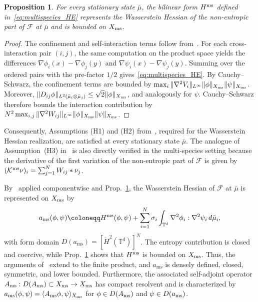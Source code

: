 \documentclass[letterpaper, 10pt, conference]{ieeeconf}
\newtheorem{proposition}[theorem]{Proposition}
\newcommand{\T}{\mathbb{T}}
\newcommand{\F}{\mathcal{F}}
\newcommand{\dotHk}[1][k]{\dot{H}^{#1}}
\begin{document}
\begin{proposition}
    \label{prop:multispecies_hessian_bound}
    For every stationary state $\bar\mu$, the bilinear form $H^{\rm ms}$ defined in~\eqref{eq:multispecies_HE} represents the Wasserstein Hessian of the non-entropic part of $\F$ at $\bar\mu$ and is bounded on $X_{\rm ms}$.
\end{proposition}

\begin{proof}
    The confinement and self-interaction terms follow from~\cite[Ex.~2.4]{KaliseMoschenPavliotis2026}.
    For each cross-interaction pair $(i,j)$, the same computation on the product space yields the differences $\nabla\phi_i(x) - \nabla\phi_j(y)$ and $\nabla\psi_i(x) - \nabla\psi_j(y)$.
    Summing over the ordered pairs with the pre-factor $1/2$ gives~\eqref{eq:multispecies_HE}.
    By Cauchy--Schwarz, the confinement terms are bounded by $\max_i \|\nabla^2 V_i\|_{L^\infty}\|\phi\|_{X_{\rm ms}} \|\psi\|_{X_{\rm ms}}$.
    Moreover, $\|D_{ij} \phi\|_{L^2(\bar\mu_i \otimes \bar\mu_j)} \le \sqrt{2}\|\phi\|_{X_{\rm ms}}$, and analogously for $\psi$.
    Cauchy--Schwarz therefore bounds the interaction contribution by $N^2 \max_{i,j} \|\nabla^2 W_{ij}\|_{L^\infty}\|\phi\|_{X_{\rm ms}}\|\psi\|_{X_{\rm ms}}$.
\end{proof}

Consequently, Assumptions (H1) and (H2) from~\cite{KaliseMoschenPavliotis2026}, required for the Wasserstein Hessian realization, are satisfied at every stationary state $\bar\mu$.
The analogue of Assumption~(H3) in~\cite{KaliseMoschenPavliotis2026} is also directly verified in the multi-species setting because the derivative of the first variation of the non-entropic part of $\F$ is given by $(\mathcal{K}^{\rm ms} \nu)_i = \sum_{j=1}^N W_{ij} \ast \nu_j$.

By~\cite[Prop.~3.1]{KaliseMoschenPavliotis2026} applied componentwise and Prop.~\ref{prop:multispecies_hessian_bound}, the Wasserstein Hessian of $\F$ at $\bar\mu$ is represented on $X_{\rm ms}$ by
\begin{equation} 
    \label{eq:ams_form} 
    a_{\mathrm{ms}}(\phi,\psi) \coloneqq H^{\rm ms}(\phi,\psi) + \sum_{i=1}^N \sigma_i \int_{\T^d} \nabla^2\phi_i : \nabla^2\psi_i \, d\bar\mu_i, 
\end{equation}
with form domain $D(a_{\mathrm{ms}}) = [\dotHk[2](\T^d)]^N$. 
The entropy contribution is closed and coercive, while Prop.~\ref{prop:multispecies_hessian_bound} shows that $H^{\rm ms}$ is bounded on $X_{\rm ms}$. 
Thus, the arguments of~\cite[Thms.~3.3--3.4]{KaliseMoschenPavliotis2026} extend to the finite product, and $a_{\mathrm{ms}}$ is densely defined, closed, symmetric, and lower bounded.
Furthermore, the associated self-adjoint operator $A_{\rm ms} : D(A_{\rm ms}) \subset X_{\rm ms} \to X_{\rm ms}$ has compact resolvent and is characterized by $a_{\rm ms}(\phi,\psi) = \langle A_{\rm ms}\phi,\psi\rangle_{X_{\rm ms}}$ for $\phi \in D(A_{\rm ms})$ and $\psi \in D(a_{\rm ms})$.
\end{document}
